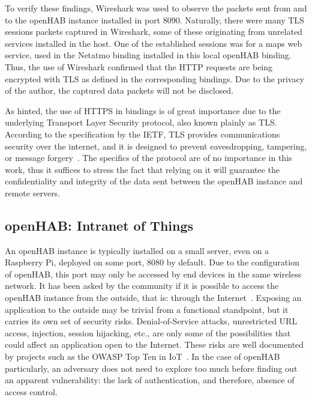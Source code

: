 \documentclass[12pt]{article}
\begin{document}
To verify these findings, Wireshark was used to observe the packets sent from and to the openHAB instance installed in port 8090. Naturally, there were many TLS sessions packets captured in Wireshark, some of these originating from unrelated services installed in the host. One of the established sessions was for a maps web service, used in the Netatmo binding installed in this local openHAB binding. Thus, the use of Wireshark confirmed that the HTTP requests are being encrypted with TLS as defined in the corresponding bindings. Due to the privacy of the author, the captured data packets will not be disclosed. 

As hinted, the use of HTTPS in bindings is of great importance due to the underlying Transport Layer Security protocol, also known plainly as TLS. According to the specification by the IETF, TLS provides communications security over the internet, and it is designed to prevent eavesdropping, tampering, or message forgery~\cite{RFC5246}. The specifics of the protocol are of no importance in this work, thus it suffices to stress the fact that relying on it will guarantee the confidentiality and integrity of the data sent between the openHAB instance and remote servers.

\subsection{openHAB: Intranet of Things}

An openHAB instance is typically installed on a small server, even on a Raspberry Pi, deployed on some port, 8080 by default. Due to the configuration of openHAB, this port may only be accessed by end devices in the same wireless network. It has been asked by the community if it is possible to access the openHAB instance from the outside, that is: through the Internet~\cite{openhab_05}. Exposing an application to the outside may be trivial from a functional standpoint, but it carries its own set of security risks. Denial-of-Service attacks, unrestricted URL access, injection, session hijacking, etc., are only some of the possibilities that could affect an application open to the Internet. These risks are well documented by projects such as the OWASP Top Ten in IoT~\cite{owasp}. In the case of openHAB particularly, an adversary does not need to explore too much before finding out an apparent vulnerability: the lack of authentication, and therefore, absence of access control.
\end{document}
